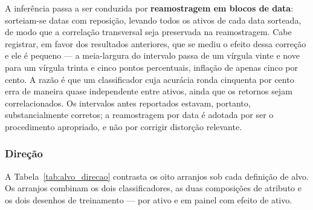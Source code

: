 A inferência passa a ser conduzida por \textbf{reamostragem em blocos de data}: sorteiam-se datas
com reposição, levando todos os ativos de cada data sorteada, de modo que a correlação transversal
seja preservada na reamostragem. Cabe registrar, em favor dos resultados anteriores, que se mediu
o efeito dessa correção e ele é pequeno --- a meia-largura do intervalo passa de um vírgula vinte e
nove para um vírgula trinta e cinco pontos percentuais, inflação de apenas cinco por cento. A razão
é que um classificador cuja acurácia ronda cinquenta por cento erra de maneira quase independente
entre ativos, ainda que os retornos sejam correlacionados. Os intervalos antes reportados estavam,
portanto, substancialmente corretos; a reamostragem por data é adotada por ser o procedimento
apropriado, e não por corrigir distorção relevante.

\subsubsection{Direção}

A Tabela~\ref{tab:alvo_direcao} contrasta os oito arranjos sob cada definição de alvo. Os arranjos
combinam os dois classificadores, as duas composições de atributo e os dois desenhos de
treinamento --- por ativo e em painel com efeito de ativo.

